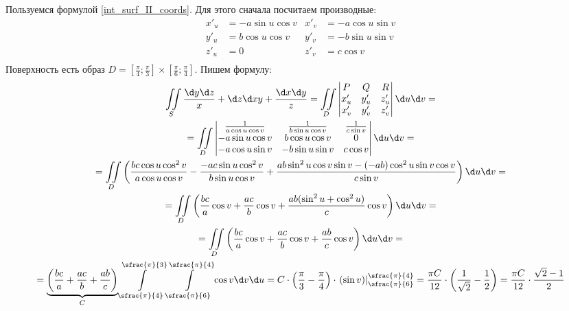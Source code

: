 	Пользуемся формулой \ref{int_surf_II_coords}.
	Для этого сначала посчитаем производные:
	\begin{align*}
		x'_u &= -a \sin u \cos v & x'_v &= -a \cos u \sin v \\
		y'_u &=  b \cos u \cos v & y'_v &= -b \sin u \sin v \\
		z'_u &= 0 & z'_v &= c \cos v \\
	\end{align*}
	Поверхность есть образ $D=[\frac \pi 4; \frac \pi 3] \times [\frac \pi 6; \frac \pi 4]$.
	Пишем формулу:
	\begin{gather*}
		\iint\limits_S \frac{\d y \d z}{x} + {\d z \d x}{y} + \frac{\d x \d y}{z} =
		\iint\limits_D \begin{vmatrix}
			P & Q & R \\
			x'_u & y'_u & z'_u \\
			x'_v & y'_v & z'_v \\
		\end{vmatrix} \d u \d v = \\
		= \iint\limits_D \begin{vmatrix}
			\frac{1}{a \cos u \cos v} & \frac{1}{b\sin u\cos v} & \frac{1}{c\sin v} \\
			-a \sin u \cos v & b \cos u \cos v & 0 \\
			-a \cos u \sin v & -b \sin u \sin v & c \cos v
		\end{vmatrix} \d u \d v = \\
		= \iint\limits_D \left(
			\frac{bc \cos u \cos^2 v}{a \cos u \cos v}
			- \frac{-ac \sin u \cos^2 v}{b\sin u\cos v} 
			+ \frac{ab\sin^2 u \cos v \sin v - (-ab)\cos^2 u \sin v \cos v}{c\sin v}
		\right) \d u \d v = \\
		= \iint\limits_D \left(
			\frac{bc}{a} \cos v
			+ \frac{ac}{b} \cos v
			+ \frac{ab(\sin^2 u + \cos^2 u)}{c} \cos v
		\right) \d u \d v = \\
		= \iint\limits_D \left(
			\frac{bc}{a} \cos v
			+ \frac{ac}{b} \cos v
			+ \frac{ab}{c} \cos v
		\right) \d u \d v = \\
		= \underbrace{\left(\frac{bc}{a} + \frac{ac}{b} + \frac{ab}{c}\right)}_{C}
		\int\limits_{\sfrac{\pi}{4}}^{\sfrac{\pi}{3}}
		\int\limits_{\sfrac{\pi}{6}}^{\sfrac{\pi}{4}}
			\cos v \d v \d u =
		C \cdot \left(\frac{\pi}{3} - \frac{\pi}{4}\right) \cdot \left.\left(\sin v\right)\right|_{\sfrac{\pi}{6}}^{\sfrac{\pi}{4}} =
		\frac{\pi C}{12} \cdot \left(\frac{1}{\sqrt 2} - \frac 12\right) =
		\frac{\pi C}{12} \cdot \frac{\sqrt 2 - 1}{2}
	\end{gather*}

